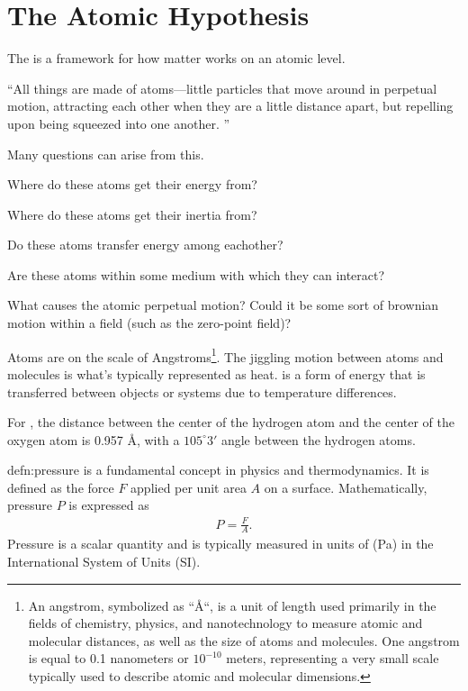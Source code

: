 \section{The Atomic Hypothesis\label{section:The Atomic Hypothesis}}

The  is a framework for how matter works on an atomic level.

\begin{quotationbox}
	``All things are made of atoms—little particles that move around in perpetual motion, attracting each other when they are a little distance apart, but repelling upon being squeezed into one another. \cite{bib:feynman lectures}''
\end{quotationbox}

Many questions can arise from this.

\begin{questions}
	\item Where do these atoms get their energy from?
	\item Where do these atoms get their inertia from?
	\item Do these atoms transfer energy among eachother?
	\item Are these atoms within some medium with which they can interact?
 	\item What causes the atomic perpetual motion? Could it be some sort of brownian motion within a field (such as the zero-point field)?
\end{questions}

Atoms are on the scale of Angstroms\footnote{An angstrom, symbolized as ``\AA``, is a unit of length used primarily in the fields of chemistry, physics, and nanotechnology to measure atomic and molecular distances, as well as the size of atoms and molecules. One angstrom is equal to 0.1 nanometers or $10^{-10}$ meters, representing a very small scale typically used to describe atomic and molecular dimensions.}. The jiggling motion between atoms and molecules is what's typically represented as heat.  is a form of energy that is transferred between objects or systems due to temperature differences.

\begin{interestnote}
	For , the distance between the center of the hydrogen atom and the center of the oxygen atom is 0.957 \AA, with a $105^\circ3'$ angle between the hydrogen atoms.
\end{interestnote}

\begin{defn}[Pressure]{defn:pressure}
	 is a fundamental concept in physics and thermodynamics. It is defined as the force $F$ applied per unit area $A$ on a surface. Mathematically, pressure $P$ is expressed as 
	\begin{align}
		P=\frac{F}{A}.
	\end{align}
	Pressure is a scalar quantity and is typically measured in units of  (Pa) in the International System of Units (SI). 
\end{defn}

